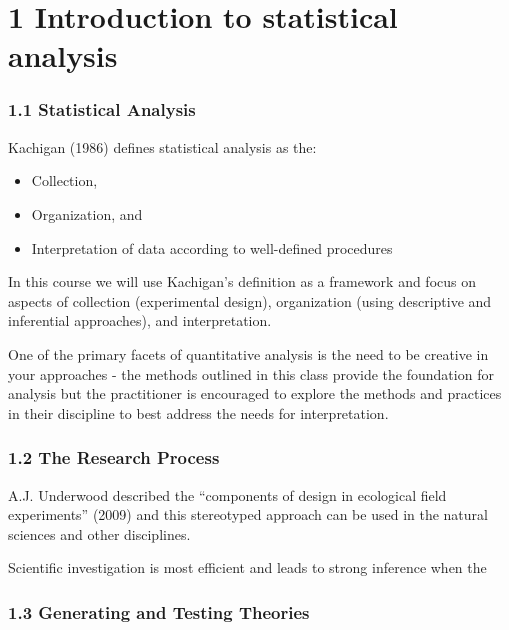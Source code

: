 \documentclass[]{article}
\title{}
\author{}
\date{}
\begin{document}
{
\setcounter{tocdepth}{3}
\tableofcontents
}
\hypertarget{introduction-to-statistical-analysis}{%
\section{1 Introduction to statistical
analysis}\label{introduction-to-statistical-analysis}}

\hypertarget{statistical-analysis}{%
\subsubsection{1.1 Statistical Analysis}\label{statistical-analysis}}

Kachigan (1986) defines statistical analysis as the:

\begin{itemize}
\item
  Collection,
\item
  Organization, and
\item
  Interpretation of data according to well-defined procedures
\end{itemize}

In this course we will use Kachigan's definition as a framework and
focus on aspects of collection (experimental design), organization
(using descriptive and inferential approaches), and interpretation.

One of the primary facets of quantitative analysis is the need to be
creative in your approaches - the methods outlined in this class provide
the foundation for analysis but the practitioner is encouraged to
explore the methods and practices in their discipline to best address
the needs for interpretation.

\hypertarget{the-research-process}{%
\subsubsection{1.2 The Research Process}\label{the-research-process}}

A.J. Underwood described the ``components of design in ecological field
experiments'' (2009) and this stereotyped approach can be used in the
natural sciences and other disciplines.

Scientific investigation is most efficient and leads to strong inference
when the

\hypertarget{generating-and-testing-theories}{%
\subsubsection{1.3 Generating and Testing
Theories}\label{generating-and-testing-theories}}
\end{document}

